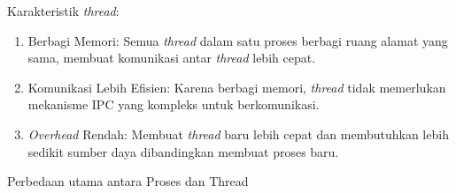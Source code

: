 \documentclass[12pt]{article}
\begin{document}
            Karakteristik \textit{thread}:
            \begin{enumerate}
                \item Berbagi Memori: Semua \textit{thread} dalam satu proses berbagi ruang alamat yang sama, membuat komunikasi antar \textit{thread} lebih cepat.
                \item Komunikasi Lebih Efisien: Karena berbagi memori, \textit{thread} tidak memerlukan mekanisme IPC yang kompleks untuk berkomunikasi.
                \item \textit{Overhead} Rendah: Membuat \textit{thread} baru lebih cepat dan membutuhkan lebih sedikit sumber daya dibandingkan membuat proses baru.
            \end{enumerate}
      \endenumerate
\item Perbedaan utama antara Proses dan Thread
\end{document}
